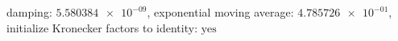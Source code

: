 damping: $\num[scientific-notation=true]{5.580384e-09}$, exponential moving average: $\num[scientific-notation=true]{4.785726e-01}$, initialize Kronecker factors to identity: $\text{yes}$